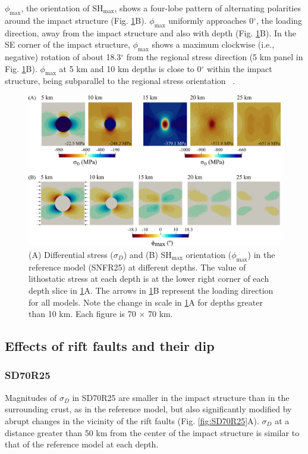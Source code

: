 \documentclass[draft]{agujournal2018}
\begin{document}
$\phi_{\max}$, the orientation of SH$_{\max}$, shows a four-lobe pattern of alternating polarities around the impact structure (Fig. \ref{fig:SNFR25_ref}B). $\phi_{\max}$ uniformly approaches 0$^\circ$, the loading direction, away from the impact structure and also with depth (Fig. \ref{fig:SNFR25_ref}B). In the SE corner of the impact structure, $\phi_{\max}$ shows a maximum clockwise (i.e., negative) rotation of about 18.3$^\circ$ from the regional stress direction (5 km panel in Fig. \ref{fig:SNFR25_ref}B). 
$\phi_{\max}$ at 5 km and 10 km depths is close to 0$^\circ$ within the impact structure, being subparallel to the regional stress orientation ~\citep{Zoback_1992}.

\begin{figure}[ht]
\centering
\includegraphics[width=30pc]{Figures/SNFR25.png}
\caption{(A) Differential stress ($\sigma_D$) and (B) SH$_{\max}$ orientation ($\phi_{\max}$) in the reference model (SNFR25) at different depths. The value of lithostatic stress at each depth is at the lower right corner of each depth slice in \ref{fig:SNFR25_ref}A. The arrows in \ref{fig:SNFR25_ref}B represent the loading direction for all models. Note the change in scale in \ref{fig:SNFR25_ref}A for depths greater than 10 km. Each figure is 70 $\times$ 70 km.} 
\label{fig:SNFR25_ref}
\end{figure} 

\subsection{Effects of rift faults and their dip}
\subsubsection{SD70R25}
Magnitudes of $\sigma_{D}$ in SD70R25 are smaller in the impact structure than in the surrounding crust, as in the reference model, but also significantly modified by abrupt changes in the vicinity of the rift faults (Fig. \ref{fig:SD70R25}A). $\sigma_{D}$ at a distance greater than 50 km from the center of the impact structure is similar to that of the reference model at each depth. 
\end{document}
